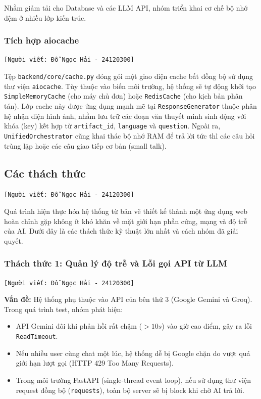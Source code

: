 Nhằm giảm tải cho Database và các LLM API, nhóm triển khai cơ chế bộ nhớ đệm ở nhiều lớp kiến trúc.

\subsubsection{Tích hợp aiocache}
\texttt{[Người viết: Đỗ Ngọc Hải - 24120300]}

Tệp \texttt{backend/core/cache.py} đóng gói một giao diện cache bất đồng bộ sử dụng thư viện \texttt{aiocache}. Tùy thuộc vào biến môi trường, hệ thống sẽ tự động khởi tạo \texttt{SimpleMemoryCache} (cho máy chủ đơn) hoặc \texttt{RedisCache} (cho kịch bản phân tán). Lớp cache này được ứng dụng mạnh mẽ tại \texttt{ResponseGenerator} thuộc phân hệ nhận diện hình ảnh, nhằm lưu trữ các đoạn văn thuyết minh sinh động với khóa (key) kết hợp từ \texttt{artifact\_id}, \texttt{language} và \texttt{question}. Ngoài ra, \texttt{UnifiedOrchestrator} cũng khai thác bộ nhớ RAM để trả lời tức thì các câu hỏi trùng lặp hoặc các câu giao tiếp cơ bản (small talk).


\subsection{Các thách thức}
\texttt{[Người viết: Đỗ Ngọc Hải - 24120300]}

Quá trình hiện thực hóa hệ thống từ bản vẽ thiết kế thành một ứng dụng web hoàn chỉnh gặp không ít khó khăn về mặt giới hạn phần cứng, mạng và độ trễ của AI. Dưới đây là các thách thức kỹ thuật lớn nhất và cách nhóm đã giải quyết.

\subsubsection{Thách thức 1: Quản lý độ trễ và Lỗi gọi API từ LLM }
\texttt{[Người viết: Đỗ Ngọc Hải - 24120300]}

\textbf{Vấn đề:}
Hệ thống phụ thuộc vào API của bên thứ 3 (Google Gemini và Groq). Trong quá trình test, nhóm phát hiện:
\begin{itemize}
    \item API Gemini đôi khi phản hồi rất chậm ($> 10s$) vào giờ cao điểm, gây ra lỗi \texttt{ReadTimeout}.
    \item Nếu nhiều user cùng chat một lúc, hệ thống dễ bị Google chặn do vượt quá giới hạn lượt gọi (HTTP 429 Too Many Requests).
    \item Trong môi trường FastAPI (single-thread event loop), nếu sử dụng thư viện request đồng bộ (\texttt{requests}), toàn bộ server sẽ bị block khi chờ AI trả lời.
\end{itemize}

